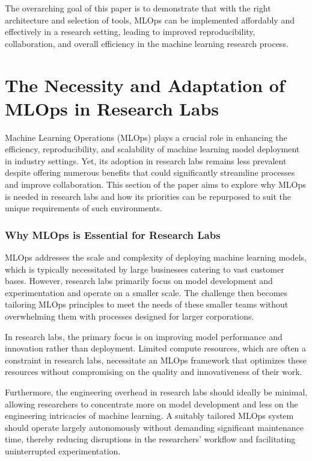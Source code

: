 The overarching goal of this paper is to demonstrate that with the right architecture and selection of tools, MLOps can be implemented affordably and effectively in a research setting, leading to improved reproducibility, collaboration, and overall efficiency in the machine learning research process.

\section{The Necessity and Adaptation of MLOps in Research Labs \label{necessity}}

Machine Learning Operations (MLOps) plays a crucial role in enhancing the efficiency, reproducibility, and scalability of machine learning model deployment in industry settings. Yet, its adoption in research labs remains less prevalent despite offering numerous benefits that could significantly streamline processes and improve collaboration. This section of the paper aims to explore why MLOps is needed in research labs and how its priorities can be repurposed to suit the unique requirements of such environments.

\subsubsection{Why MLOps is Essential for Research Labs \label{why-mlops}}

MLOps addresses the scale and complexity of deploying machine learning models, which is typically necessitated by large businesses catering to vast customer bases. However, research labs primarily focus on model development and experimentation and operate on a smaller scale. The challenge then becomes tailoring MLOps principles to meet the needs of these smaller teams without overwhelming them with processes designed for larger corporations.

In research labs, the primary focus is on improving model performance and innovation rather than deployment. Limited compute resources, which are often a constraint in research labs, necessitate an MLOps framework that optimizes these resources without compromising on the quality and innovativeness of their work.

Furthermore, the engineering overhead in research labs should ideally be minimal, allowing researchers to concentrate more on model development and less on the engineering intricacies of machine learning. A suitably tailored MLOps system should operate largely autonomously without demanding significant maintenance time, thereby reducing disruptions in the researchers' workflow and facilitating uninterrupted experimentation.

